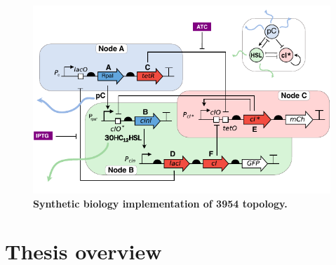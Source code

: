 \begin{figure}[H]
    \centering
    \includegraphics[width=1\textwidth]{chapters/Introduction/synthetic circuit}
    \caption[\textbf{Synthetic biology implementation of 3954) topology.}]{\textbf{Synthetic biology implementation of 3954 topology.} } %
    \label{fig:synthetic circuit}
\end{figure}




\section{Thesis overview}

